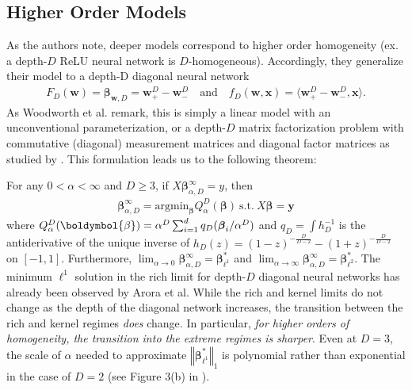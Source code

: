 \documentclass{article}
\newenvironment{manualtheorem}[1]{%
  \renewcommand\themanualtheoreminner{#1}%
  \manualtheoreminner
}{\endmanualtheoreminner}
\begin{document}
\subsection{Higher Order Models}
As the authors note, deeper models correspond to higher order homogeneity (ex. a depth-$D$ ReLU neural network is $D$-homogeneous). Accordingly, they generalize their model to a depth-D diagonal neural network
\begin{align*}
    F_D(\boldsymbol{w}) = \boldsymbol{\beta}_{\boldsymbol{w}, D} = \boldsymbol{w}_+^D - \boldsymbol{w}_-^D \quad \text{and} \quad f_D(\boldsymbol{w}, \boldsymbol{x})  = \langle \boldsymbol{w}_+^D - \boldsymbol{w}_-^D, \boldsymbol{x} \rangle.
\end{align*}
As Woodworth et al. remark, this is simply a linear model with an unconventional parameterization, or a depth-$D$ matrix factorization problem with commutative (diagonal) measurement matrices and diagonal factor matrices as studied by \cite{arora2019implicit}. This formulation leads us to the following theorem:
\begin{manualtheorem}{3}
For any $0 < \alpha < \infty$ and $D \geq 3$, if $X \boldsymbol{\beta}_{\alpha, D}^{\infty} = y$, then
\begin{align*}
    \boldsymbol{\beta}_{\alpha, D}^{\infty} = \text{argmin}_{\boldsymbol{\beta}} Q_{\alpha}^D(\boldsymbol{\beta}) \ \text{s.t.} \ X \boldsymbol{\beta} = \boldsymbol{y}
\end{align*}
where $Q_{\alpha}^D(\boldymbol{\beta}) = \alpha^D \sum_{i=1}^d q_D(\boldsymbol{\beta}_i/\alpha^D)$ and $q_D = \int h_D^{-1}$ is the antiderivative of the unique inverse of $h_D(z) = (1-z)^{-\frac{D}{D-2}} - (1+z)^{-\frac{D}{D-2}}$ on $[-1, 1]$. Furthermore, $\lim_{\alpha \rightarrow 0} \boldsymbol{\beta}_{\alpha, D}^{\infty} = \boldsymbol{\beta}_{\ell^1}^*$ and $\lim_{\alpha \rightarrow \infty} \boldsymbol{\beta}_{\alpha, D}^{\infty} = \boldsymbol{\beta}_{\ell^2}^*$.
\end{manualtheorem}
The minimum $\ell^1$ solution in the rich limit for depth-$D$ diagonal neural networks has already been observed by Arora et al. While the rich and kernel limits do not change as the depth of the diagonal network increases, the transition between the rich and kernel regimes \textit{does} change. In particular, \textit{for higher orders of homogeneity, the transition into the extreme regimes is sharper}. Even at $D=3$, the scale of $\alpha$ needed to approximate $\left\Vert \boldsymbol{\beta}_{\ell^1}^* \right\Vert_1$ is polynomial rather than exponential in the case of $D=2$ (see Figure 3(b) in \cite{woodworth2020kernel}). 
\end{document}
